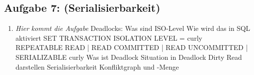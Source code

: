 \subsection{Aufgabe 7: (Serialisierbarkeit)}
\label{sec:Aufgabe7}
\begin{enumerate}[label=\alph*)]
    \item \textit{Hier kommt die Aufgabe}
    Deadlocks:
Was sind ISO-Level
Wie wird das in SQL aktiviert
SET TRANSACTION ISOLATION LEVEL = curly
REPEATABLE READ | READ COMMITTED |
READ UNCOMMITTED | SERIALIZABLE
curly
Was ist Deadlock
Situation in Deadlock
Dirty Read darstellen
Serialisierbarkeit Konfliktgraph und -Menge
\end{enumerate}